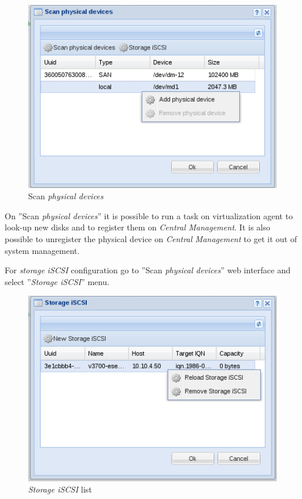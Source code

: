 \begin{figure}[H]
        \begin{center}
        \includegraphics[scale=0.45]{screenshots/node_storage_device_search.png}
        \caption{Scan \emph{physical devices} }
        \label{fig:storage_device_search}
        \end{center}
\end{figure}

On ''Scan \emph{physical devices}'' it is possible to run a task on virtualization agent to look-up new disks and to register them on \emph{Central Management}. It is also possible to unregister the physical device on \emph{Central Management} to get it out of system management.

For \emph{storage} \emph{iSCSI} configuration go to ''Scan \emph{physical devices}'' web interface and select ''\emph{Storage iSCSI}'' menu.

\begin{figure}[H]
        \begin{center}
        \includegraphics[scale=0.45]{screenshots/node_storage_iscsi_grid.png}
        \caption{\emph{Storage iSCSI} list}
        \label{fig:storage_iscsi_grid}
        \end{center}
\end{figure}

